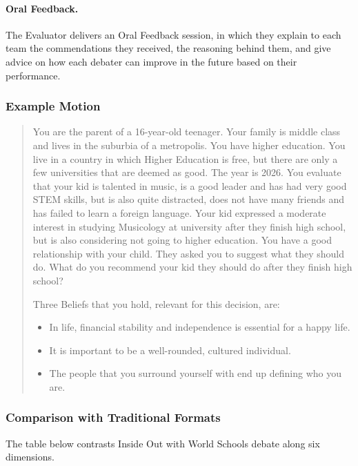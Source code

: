 \paragraph{Oral Feedback.} The Evaluator delivers an Oral Feedback session, in which they explain to each team the commendations they received, the reasoning behind them, and give advice on how each debater can improve in the future based on their performance.

\subsubsection{Example Motion}

\begin{quote}
You are the parent of a 16-year-old teenager. Your family is middle class and lives in the suburbia of a metropolis. You have higher education. You live in a country in which Higher Education is free, but there are only a few universities that are deemed as good. The year is 2026. You evaluate that your kid is talented in music, is a good leader and has had very good STEM skills, but is also quite distracted, does not have many friends and has failed to learn a foreign language. Your kid expressed a moderate interest in studying Musicology at university after they finish high school, but is also considering not going to higher education. You have a good relationship with your child. They asked you to suggest what they should do. What do you recommend your kid they should do after they finish high school?

\medskip

Three Beliefs that you hold, relevant for this decision, are:
\begin{itemize}
    \item In life, financial stability and independence is essential for a happy life.
    \item It is important to be a well-rounded, cultured individual.
    \item The people that you surround yourself with end up defining who you are.
\end{itemize}
\end{quote}

\subsubsection{Comparison with Traditional Formats}

The table below contrasts Inside Out with World Schools debate along six dimensions.

